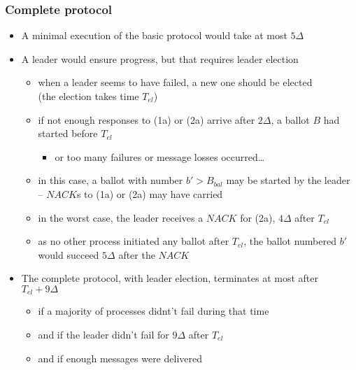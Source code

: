 \documentclass[10 pt]{beamer}
\begin{document}
\begin{frame}
  \frametitle{Complete protocol}
  
  \begin {itemize}
    \item A minimal execution of the basic protocol would take at most $5\Delta$
    \pause
    \vspace{2 mm}
    \item A leader would ensure progress, but that requires leader election     
    \begin {itemize}
      \item when a leader seems to have failed, a new one should be elected\\
      (the election takes time $T_{el}$)
      \item if not enough responses to (1a) or (2a) arrive after $2\Delta$, a ballot $B$ had started before $T_{el}$
      \begin{itemize}
        \item or too many failures or message losses occurred\ldots %
      \end{itemize}
      \item in this case, a ballot with number $b' > B_{bal}$ may be started by the leader -- $NACK$s to (1a) or (2a) may have carried \bbal
      \item in the worst case, the leader receives a $NACK$ for (2a), $4\Delta$ after $T_{el}$
      \item as no other process initiated any ballot after $T_{el}$, the ballot numbered $b'$ would succeed $5\Delta$ after the $NACK$
    \end{itemize}
    \vspace{2 mm}
    \pause
    \item The complete protocol, with leader election, terminates at most after $T_{el} + 9\Delta$
    \begin{itemize}
      \item if a majority of processes didnt't fail during that time
      \item and if the leader didn't fail for $9\Delta$ after $T_{el}$
      \item and if enough messages were delivered
    \end{itemize}   

  \end{itemize}
  
\end{frame}
\end{document}
